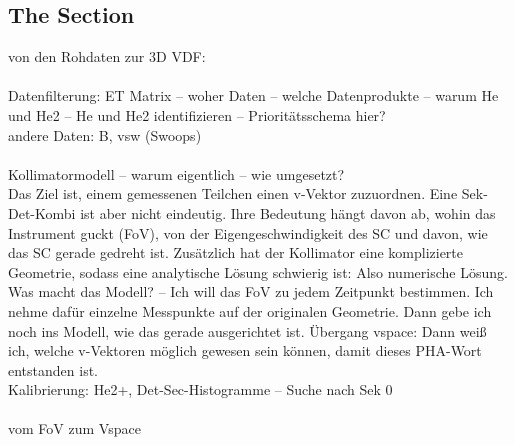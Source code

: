\subsection{The Section}
von den Rohdaten zur 3D VDF: 
\\ \\ 
Datenfilterung: ET Matrix -- woher Daten -- welche Datenprodukte -- warum He und He2 -- He und He2 identifizieren -- Prioritätsschema hier? \\
andere Daten: B, vsw (Swoops)
\\ \\ 
Kollimatormodell -- warum eigentlich -- wie umgesetzt?
\\
Das Ziel ist, einem gemessenen Teilchen einen v-Vektor zuzuordnen. Eine Sek-Det-Kombi ist aber nicht eindeutig. Ihre Bedeutung hängt davon ab, wohin das Instrument guckt (FoV), von der Eigengeschwindigkeit des SC und davon, wie das SC gerade gedreht ist. Zusätzlich hat der Kollimator eine komplizierte Geometrie, sodass eine analytische Lösung schwierig ist: Also numerische Lösung.\\
Was macht das Modell? -- Ich will das FoV zu jedem Zeitpunkt bestimmen. Ich nehme dafür einzelne Messpunkte auf der originalen Geometrie. Dann gebe ich noch ins Modell, wie das gerade ausgerichtet ist.
Übergang vspace: Dann weiß ich, welche v-Vektoren möglich gewesen sein können, damit dieses PHA-Wort entstanden ist.
\\
Kalibrierung: He2+, Det-Sec-Histogramme -- Suche nach Sek 0
\\ \\
vom FoV zum Vspace
\\ \\ \\
